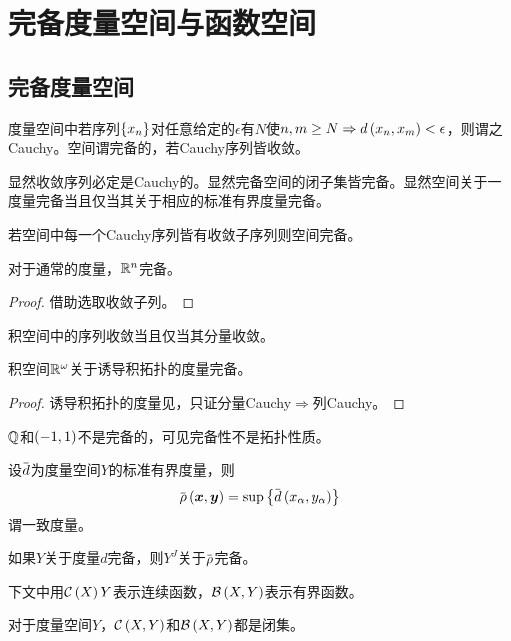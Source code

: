 \documentclass{ctexrep}
\begin{document}
  \section{完备度量空间与函数空间}
  \subsection{完备度量空间}
  \begin{definition}
  \label{def:cauchy}
    度量空间中若序列$\left\{x_n\right\}$对任意给定的$\epsilon$有$N$使$n,m\ge N\Rightarrow d\left(x_n,x_m\right)< \epsilon$，则谓之Cauchy。空间谓完备的，若Cauchy序列皆收敛。
  \end{definition}
  显然收敛序列必定是Cauchy的。显然完备空间的闭子集皆完备。显然空间关于一度量完备当且仅当其关于相应的标准有界度量完备。
  \begin{lemma}
    若空间中每一个Cauchy序列皆有收敛子序列则空间完备。
  \end{lemma}
  \begin{lemma}
    对于通常的度量，$\mathbb{R}^n$完备。
  \end{lemma}
  \begin{proof}
    借助选取收敛子列。
  \end{proof}
  \begin{lemma}
    积空间中的序列收敛当且仅当其分量收敛。
  \end{lemma}
  \begin{theorem}
    积空间$\mathbb{R}^\omega$关于诱导积拓扑的度量完备。
  \end{theorem}
  \begin{proof}
    诱导积拓扑的度量见，只证分量Cauchy$\Rightarrow$列Cauchy。
  \end{proof}
  \begin{ex}
    $\mathbb{Q}$和$\left(-1,1\right)$不是完备的，可见完备性不是拓扑性质。
  \end{ex}
  \begin{definition}
    设$\sbm{d}$为度量空间$Y$的标准有界度量，则
    \[ \sbm{\rho}\pare{\vx,\vy} = \sup\curb{\sbm{d}\pare{x_\alpha,y_\alpha}} \]
    谓一致度量。
  \end{definition}
  \begin{theorem}
    如果$Y$关于度量$d$完备，则$Y^J$关于$\sbm{\rho}$完备。
  \end{theorem}
  下文中用$\mathcal{C}\left(X\right){Y}$表示连续函数，$\mathcal{B}\left(X,Y\right)$表示有界函数。
  \begin{theorem}
    对于度量空间$Y$，$\mathcal{C}\left(X,Y\right)$和$\mathcal{B}\left(X,Y\right)$都是闭集。
  \end{theorem}
\end{document}
